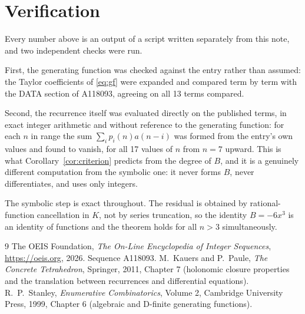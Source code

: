 \documentclass[11pt,a4paper]{article}
\theoremstyle{plain}
\theoremstyle{definition}
\begin{document}
\section{Verification}

Every number above is an output of a script written separately from this note, and two
independent checks were run.

First, the generating function was checked against the entry rather than assumed: the
Taylor coefficients of \eqref{eq:gf} were expanded and compared term by term with the DATA
section of A118093, agreeing on all 13 terms compared.

Second, the recurrence itself was evaluated directly on the published terms, in exact
integer arithmetic and without reference to the generating function: for each $n$ in range
the sum $\sum_{i}p_{i}(n)a(n-i)$ was formed from the entry's own values and found to
vanish, for all 17 values of $n$ from $n=7$ upward. This is what
Corollary~\ref{cor:criterion} predicts from the degree of $B$, and it is a genuinely
different computation from the symbolic one: it never forms $B$, never differentiates, and
uses only integers.

The symbolic step is exact throughout. The residual is obtained by rational-function
cancellation in $K$, not by series truncation, so the identity $B=- 6 x^{3}$ is an
identity of functions and the theorem holds for all $n>3$ simultaneously.

\begin{thebibliography}{9}
 The OEIS Foundation, \emph{The On-Line Encyclopedia of Integer Sequences},
\url{https://oeis.org}, 2026. Sequence A118093.
 M.~Kauers and P.~Paule, \emph{The Concrete Tetrahedron}, Springer, 2011,
Chapter 7 (holonomic closure properties and the translation between recurrences and
differential equations).
 R.~P.~Stanley, \emph{Enumerative Combinatorics}, Volume 2, Cambridge
University Press, 1999, Chapter 6 (algebraic and D-finite generating functions).
\end{thebibliography}
\end{document}
